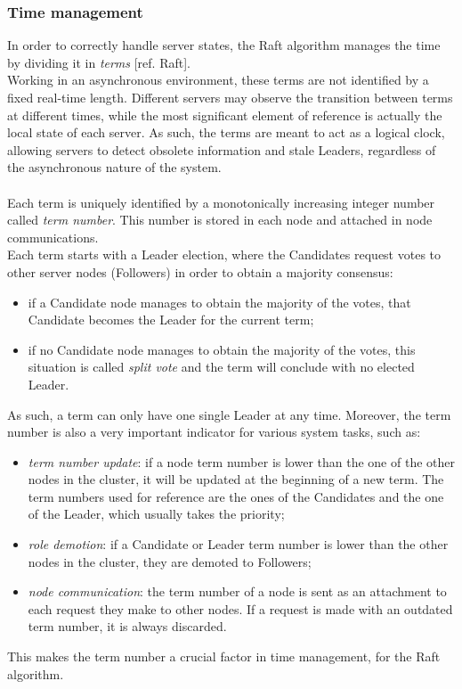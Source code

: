 \subsubsection{Time management}
In order to correctly handle server states, the Raft algorithm manages the time by dividing it in \textit{terms} [ref. Raft]. \\
Working in an asynchronous environment, these terms are not identified by a fixed real-time length. Different servers may observe the transition between terms at different times, while the most significant element of reference is actually the local state of each server. As such, the terms are meant to act as a logical clock, allowing servers to detect obsolete information and stale Leaders, regardless of the asynchronous nature of the system. \\ \\
Each term is uniquely identified by a monotonically increasing integer number called \textit{term number}. This number is stored in each node and attached in node communications. \\
Each term starts with a Leader election, where the Candidates request votes to other server nodes (Followers) in order to obtain a majority consensus:
\begin{itemize}
	\item if a Candidate node manages to obtain the majority of the votes, that Candidate becomes the Leader for the current term;
	\item if no Candidate node manages to obtain the majority of the votes, this situation is called \textit{split vote} and the term will conclude with no elected Leader.
\end{itemize}
As such, a term can only have one single Leader at any time. Moreover, the term number is also a very important indicator for various system tasks, such as:
\begin{itemize}
	\item \textit{term number update}: if a node term number is lower than the one of the other nodes in the cluster, it will be updated at the beginning of a new term. The term numbers used for reference are the ones of the Candidates and the one of the Leader, which usually takes the priority;
	\item \textit{role demotion}: if a Candidate or Leader term number is lower than the other nodes in the cluster, they are demoted to Followers;
	\item \textit{node communication}: the term number of a node is sent as an attachment to each request they make to other nodes. If a request is made with an outdated term number, it is always discarded.
\end{itemize}
This makes the term number a crucial factor in time management, for the Raft algorithm.

